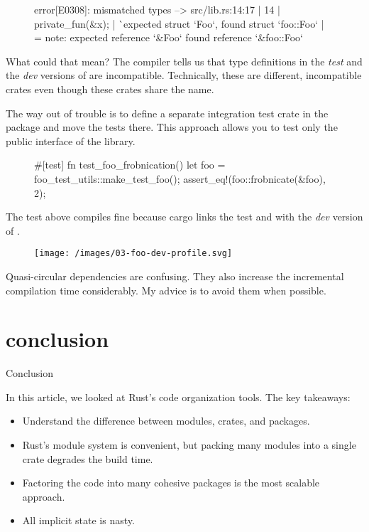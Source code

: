\documentclass{article}
\begin{document}
\begin{figure}
\begin{code}[bad]
error[E0308]: mismatched types
  --> src/lib.rs:14:17
   |
14 |     private_fun(&x);
   |                 ^^ expected struct `Foo`, found struct `foo::Foo`
   |
   = note: expected reference `&Foo`
              found reference `&foo::Foo`
\end{code}
\end{figure}

What could that mean?
The compiler tells us that type definitions in the \emph{test} and the \emph{dev} versions of  are incompatible.
Technically, these are different, incompatible crates even though these crates share the name.

The way out of trouble is to define a separate integration test crate in the  package and move the tests there.
This approach allows you to test only the public interface of the  library.

\begin{figure}
\begin{code}[good]
#[test]
fn test_foo_frobnication() {
    let foo = foo_test_utils::make_test_foo();
    assert_eq!(foo::frobnicate(&foo), 2);
}
\end{code}
\end{figure}

The test above compiles fine because cargo links the test and  with the \emph{dev} version of .

\begin{figure}[grayscale-diagram]
  \texttt{[image: /images/03-foo-dev-profile.svg]}
\end{figure}

Quasi-circular dependencies are confusing.
They also increase the incremental compilation time considerably.
My advice is to avoid them when possible.

\section{conclusion}{Conclusion}

In this article, we looked at Rust's code organization tools.
The key takeaways:
\begin{itemize}
  \item
    Understand the difference between modules, crates, and packages.
  \item
    Rust's module system is convenient, but packing many modules into a single crate degrades the build time.
  \item
    Factoring the code into many cohesive packages is the most scalable approach.
  \item
    All implicit state is nasty.
\end{itemize}
\end{document}
